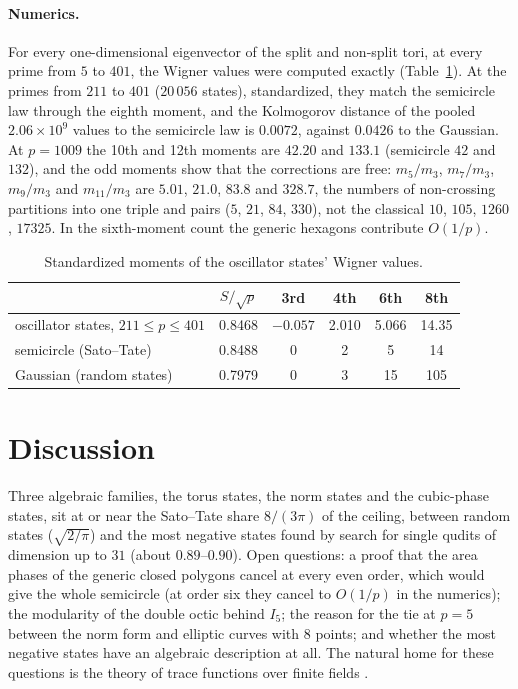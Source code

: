 \documentclass[11pt]{article}
\theoremstyle{remark}
\begin{document}
\paragraph{Numerics.} For every one-dimensional eigenvector of the split and non-split tori, at every prime from $5$ to
$401$, the Wigner values were computed exactly (Table~\ref{tab:torus}). At the primes from $211$ to $401$ ($20\,056$
states), standardized, they match the semicircle law through the eighth moment, and the Kolmogorov distance of the
pooled $2.06\times10^9$ values to the semicircle law is $0.0072$, against $0.0426$ to the Gaussian. At $p=1009$ the
10th and 12th moments are $42.20$ and $133.1$ (semicircle $42$ and $132$), and the odd moments show that the
corrections are free: $m_5/m_3$, $m_7/m_3$, $m_9/m_3$ and $m_{11}/m_3$ are $5.01$, $21.0$, $83.8$ and $328.7$, the
numbers of non-crossing partitions into one triple and pairs ($5$, $21$, $84$, $330$), not the classical
$10$, $105$, $1260$, $17325$. In the sixth-moment count the generic hexagons contribute $O(1/p)$.

\begin{table}[h]\centering
\begin{tabular}{lccccc}\toprule
 & $S/\sqrt p$ & 3rd & 4th & 6th & 8th\\\midrule
oscillator states, $211\le p\le401$ & 0.8468 & $-0.057$ & 2.010 & 5.066 & 14.35\\
semicircle (Sato--Tate) & 0.8488 & 0 & 2 & 5 & 14\\
Gaussian (random states) & 0.7979 & 0 & 3 & 15 & 105\\\bottomrule
\end{tabular}
\caption{Standardized moments of the oscillator states' Wigner values.}\label{tab:torus}
\end{table}

\section{Discussion}
Three algebraic families, the torus states, the norm states and the cubic-phase states, sit at or near the Sato--Tate
share $8/(3\pi)$ of the ceiling, between random states ($\sqrt{2/\pi}$) and the most negative states found by search
for single qudits of dimension up to $31$ (about $0.89$--$0.90$). Open questions: a proof that the area phases of the generic
closed polygons cancel at every even order, which would give the whole semicircle (at order six they cancel to
$O(1/p)$ in the numerics); the modularity of the double octic behind $I_5$; the reason for the tie at $p=5$ between the norm form and
elliptic curves with $8$ points; and whether the most negative states have an algebraic description at all. The
natural home for these questions is the theory of trace functions over finite fields \cite{FKMS}.
\end{document}
